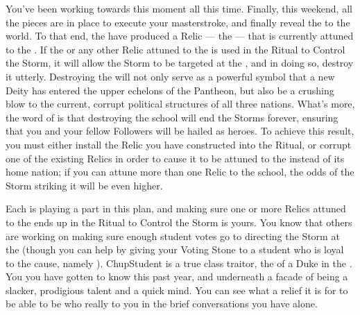 \documentclass[char]{GL2020}
\begin{document}
You've been working towards this moment all this time. Finally, this weekend, all the pieces are in place to execute your masterstroke, and finally reveal the \pGoaties{} to the world. To that end, the \pGoaties{} have produced a Relic — the \iHorseshoe{} — that is currently attuned to the \pSchool{}. If the \iHorseshoe{} or any other Relic attuned to the \pSc{} is used in the Ritual to Control the Storm, it will allow the Storm to be targeted at the \pSchool{}, and in doing so, destroy it utterly. Destroying the \pSc{} will not only serve as a powerful symbol that a new Deity has entered the upper echelons of the Pantheon, but also be a crushing blow to the current, corrupt political structures of all three nations. What's more, the word of \cGenesis{} is that destroying the school will end the Storms forever, ensuring that you and your fellow Followers will be hailed as heroes. To achieve this result, you must either install the Relic you have constructed into the Ritual, or corrupt one of the existing Relics in order to cause it to be attuned to the \pSc{} instead of its home nation; if you can attune more than one Relic to the school, the odds of the Storm striking it will be even higher. 

Each \pGoatie{} is playing a part in this plan, and making sure one or more Relics attuned to the \pSc{} ends up in the Ritual to Control the Storm is yours. You know that others are working on making sure enough student votes go to directing the Storm at the \pSc{} (though you can help by giving your Voting Stone to a student who is loyal to the cause, namely \cChupStudent{\full}). ChupStudent{} is a true class traitor, the \cChupStudent{\child} of a Duke in the \pFarm{}. You you have gotten to know \cChupStudent{} this past year, and underneath a facade of being a slacker, \cChupStudent{\they} \cChupStudent{\have} prodigious talent and a quick mind. You can see what a relief it is for \cChupStudent{\them} to be able to be who \cChupStudent{\they} really \cChupStudent{\are} to you in the brief conversations you have alone.  
\end{document}
